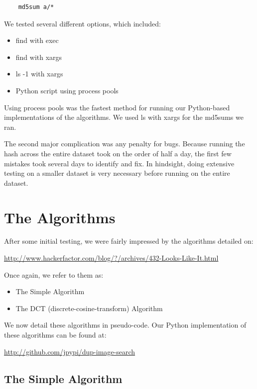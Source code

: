 \documentclass[11pt,a4paper,titlepage]{article}
\begin{document}
\begin{lstlisting}
    md5sum a/*
\end{lstlisting}

We tested several different options, which included:


\begin{itemize}
    \item
        find with exec
    \item
        find with xargs
    \item
        ls -1 with xargs
    \item
        Python script using process pools
\end{itemize}

Using process pools was the fastest method for running our Python-based
implementations of the algorithms.  We used ls with xargs for the md5sums we
ran.

The second major complication was any penalty for bugs.  Because running the hash
across the entire dataset took on the order of half a day, the first few
mistakes took several days to identify and fix.  In hindsight, doing extensive
testing on a smaller dataset is very necessary before running on the entire
dataset.


\section{The Algorithms}

After some initial testing, we were fairly impressed by the algorithms detailed
on:

\url{http://www.hackerfactor.com/blog/?/archives/432-Looks-Like-It.html}

Once again, we refer to them as:

\begin{itemize}
    \item
        The Simple Algorithm
    \item
        The DCT (discrete-cosine-transform) Algorithm
\end{itemize}

We now detail these algorithms in pseudo-code.  Our Python implementation of
these algorithms can be found at:

\url{http://github.com/jpypi/dup-image-search}

\newpage

\subsection{The Simple Algorithm}
\end{document}
